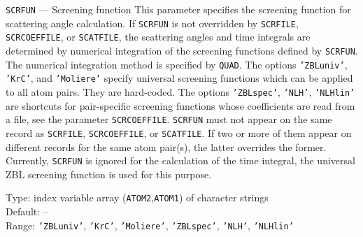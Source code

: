 \begin{keydescription}{\texttt{SCRFUN} --- Screening function}
%
  This parameter specifies the screening function for scattering angle
  calculation. If \texttt{SCRFUN} is not overridden by \texttt{SCRFILE},
  \texttt{SCRCOEFFILE}, or \texttt{SCATFILE}, the scattering angles and time 
  integrals are determined by numerical integration of the screening 
  functions defined by \texttt{SCRFUN}. The numerical integration method is 
  specified by \texttt{QUAD}. The options \texttt{'ZBLuniv'}, \texttt{'KrC'}, 
  and \texttt{'Moliere'} specify universal screening functions which can be
  applied to all atom pairs. They are hard-coded. The options 
  \texttt{'ZBLspec'}, \texttt{'NLH'}, \texttt{'NLHlin'} are shortcuts for
  pair-specific screening functions whose coefficients are read from a
  file, see the parameter \texttt{SCRCOEFFILE}. \texttt{SCRFUN} must not 
  appear on the same record as \texttt{SCRFILE}, \texttt{SCRCOEFFILE}, or 
  \texttt{SCATFILE}. If two or more of them appear on different records for 
  the same atom pair(s), the latter overrides the former. Currently, 
  \texttt{SCRFUN} is ignored for the calculation of the time integral, the 
  universal ZBL screening function is used for this purpose.
  \begin{keytab}
    Type:    \> index variable array (\texttt{ATOM2},\texttt{ATOM1}) 
                of character strings \\ 
    Default: \> -- \\
    Range:   \> \texttt{'ZBLuniv'}, \texttt{'KrC'}, \texttt{'Moliere'},
    			\texttt{'ZBLspec'}, \texttt{'NLH'}, \texttt{'NLHlin'}
  \end{keytab}
\end{keydescription}

